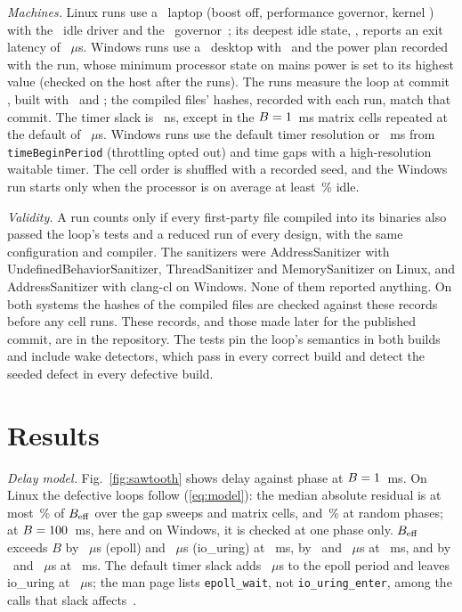 \emph{Machines.} Linux runs use a \WakeHostLinuxCpu\ laptop (boost off, performance governor,
kernel \WakeHostLinuxKernel) with the \WakeCpuidleDriver\ idle driver and the
\WakeCpuidleGovernor\ governor~\cite{kernel2026cpuidle}; its deepest idle state,
\WakeCpuidleDeepest, reports an exit latency of \WakeCpuidleDeepestLatencyUs~$\mu$s. Windows
runs use a \WakeHostWindowsCpu\ desktop with \WakeHostWindowsOs\ and the power plan recorded
with the run, whose minimum processor state on mains power is set to its highest value (checked
on the host after the runs). The runs measure the loop at commit
\texttt{\WakeCodeCommitLinux}, built with \WakeCompilerLinux\ and \WakeCompilerWindows; the
compiled files' hashes, recorded with each run, match that commit. The timer slack is \WakeSlackNs~ns, except in the $B = 1$~ms
matrix cells repeated at the default of \WakeSlackDefaultUs~$\mu$s. Windows runs use the default
timer resolution or \WakeTimerRequestedMs~ms from \texttt{timeBeginPeriod} (throttling opted
out) and time gaps with a high-resolution waitable timer. The cell order is shuffled with a
recorded seed, and the Windows run starts only when the processor is on average at least
\WakeQuietThresholdPct\,\% idle.

\emph{Validity.} A run counts only if every first-party file compiled into its binaries also
passed the loop's tests and a reduced run of every design, with the same configuration and
compiler. The sanitizers were AddressSanitizer with UndefinedBehaviorSanitizer,
ThreadSanitizer and MemorySanitizer on Linux, and AddressSanitizer with clang-cl on Windows.
None of them reported anything. On both systems the hashes of the compiled files are checked
against these records before any cell runs. These records, and those made later for the published
commit, are in the repository. The tests pin the loop's semantics in both builds
and include wake detectors, which pass in every correct build and detect the seeded defect in
every defective build.

\section{Results}\label{sec:results}

\emph{Delay model.} Fig.~\ref{fig:sawtooth} shows delay against phase at $B = 1$~ms.
On Linux the defective loops follow (\ref{eq:model}): the median absolute residual is at most
\WakeHOneLinuxMaxPct\,\% of $B_{\mathrm{eff}}$ over the gap sweeps and matrix cells, and
\WakeRandomAbsResidualPctMax\,\% at random phases; at $B = 100$~ms, here and on
Windows, it is checked at one phase only. $B_{\mathrm{eff}}$ exceeds $B$ by \WakeEpollBEffExcessOneMs~$\mu$s
(epoll) and \WakeUringBEffExcessOneMs~$\mu$s (io\_uring) at \WakeBSmallMs~ms, by
\WakeSweepEpollBEffExcessTenMs\ and \WakeSweepUringBEffExcessTenMs~$\mu$s at \WakeBMidMs~ms, and
by \WakeEpollBEffExcessOneHundredMs\ and \WakeUringBEffExcessOneHundredMs~$\mu$s at
\WakeBLargeMs~ms. The default timer slack adds \WakeEpollSlackEffectOneMs~$\mu$s to the epoll
period and leaves io\_uring at \WakeUringBEffOneMsDefaultSlack~$\mu$s; the man page lists
\texttt{epoll\_wait}, not \texttt{io\_\allowbreak{}uring\_\allowbreak{}enter}, among the calls that
slack affects~\cite{manpages2026timerslack}.

